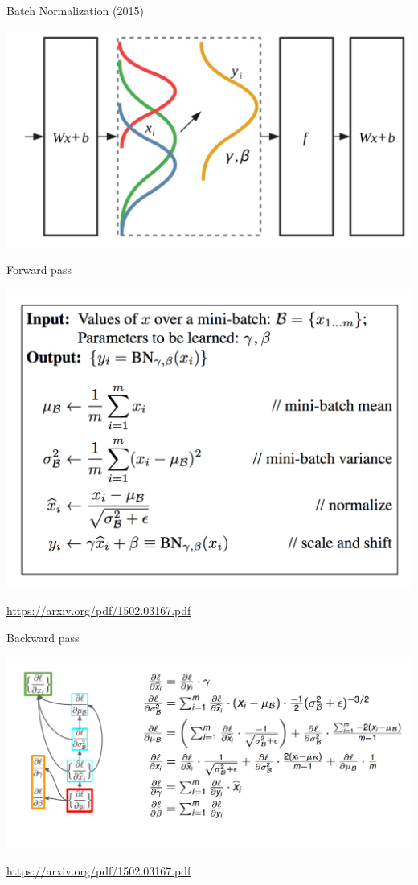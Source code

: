 \documentclass[notes,12pt, aspectratio=169]{beamer}
\begin{document}
\begin{frame}{Batch Normalization (2015)}
	\begin{center}
		\includegraphics[width=.7\linewidth]{distributions_nice.png}
	\end{center}
\end{frame}


\begin{frame}{Forward pass}
	\begin{center}
		\includegraphics[width=.63\linewidth]{batch_formulas.png}
	\end{center}
	\vfill %
	\footnotesize
	{\color{blue} \url{https://arxiv.org/pdf/1502.03167.pdf}}
\end{frame}


\begin{frame}{Backward pass}
	\begin{center}
		\includegraphics[width=.95\linewidth]{batch_grad.png}
	\end{center}
	\vfill %
	\footnotesize
	{\color{blue} \url{https://arxiv.org/pdf/1502.03167.pdf}}
\end{frame}
\end{document}
